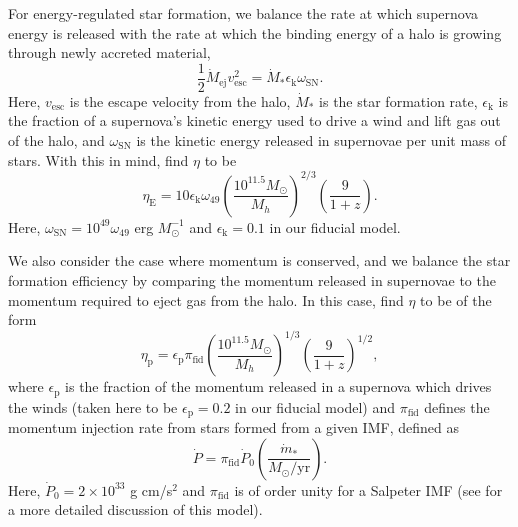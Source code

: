 \documentclass[a4paper,fleqn,usenatbib]{mnras}
\begin{document}
For energy-regulated 
star formation, we balance the rate at which 
supernova energy is released with the rate at which the binding energy of a halo is growing through newly accreted material,
\begin{equation}
\frac{1}{2}\dot{M}_\text{ej} v_\text{esc}^2 = \dot{M}_\ast \epsilon_\text{k} \omega_\text{SN}.
\end{equation}
Here, $v_\text{esc}$ is the escape velocity from the halo, $\dot{M}_\ast$ is the star formation rate, $\epsilon_\text{k}$ is the fraction of a supernova's kinetic energy used to drive a wind and lift gas out of the halo, and $\omega_\text{SN}$ is the kinetic energy released in supernovae per unit mass of stars. With this in mind, \citet{furlanetto_2016} find $\eta$ to be
\begin{equation}
\eta_{\text{E}} = 10 \epsilon_\text{k} \omega_{49} \left( \frac{10^{11.5} M_\odot}{M_h}\right)^{2/3} \left( \frac{9}{1 + z}\right).
\label{eq:etaE}
\end{equation}
Here, $\omega_\text{SN} = 10^{49} \omega_{49}$ erg $M_\odot^{-1}$ and $\epsilon_\text{k} = 0.1$ in our fiducial model.

We also consider the case where momentum is conserved, and we balance the star formation efficiency by comparing the momentum released in supernovae to the momentum required to eject gas from the halo. In this case, \citet{furlanetto_2016} find $\eta$ to be of the form
\begin{equation}
\eta_\text{p} = \epsilon_\text{p} \pi_\text{fid} \left( \frac{10^{11.5} M_\odot}{M_h}\right)^{1/3} \left( \frac{9}{1 + z}\right)^{1/2},
\end{equation}
where $\epsilon_\text{p}$ is the fraction of the momentum released in a supernova which drives the winds (taken here to be $\epsilon_\text{p} = 0.2$ in our fiducial model) and $\pi_\text{fid}$ defines the momentum injection rate from stars formed from a given IMF, defined as
\begin{equation}
\dot{P} = \pi_\text{fid} \dot{P}_0 \left( \frac{\dot{m}_\ast}{M_\odot / \text{yr}}\right).
\end{equation}
Here, $\dot{P}_0 = 2 \times 10^{33}$ g cm/s$^2$ and $\pi_\text{fid}$ is of order unity for a Salpeter IMF (see 
\citealt{furlanetto_2016} for a more detailed discussion of this model).
\end{document}
